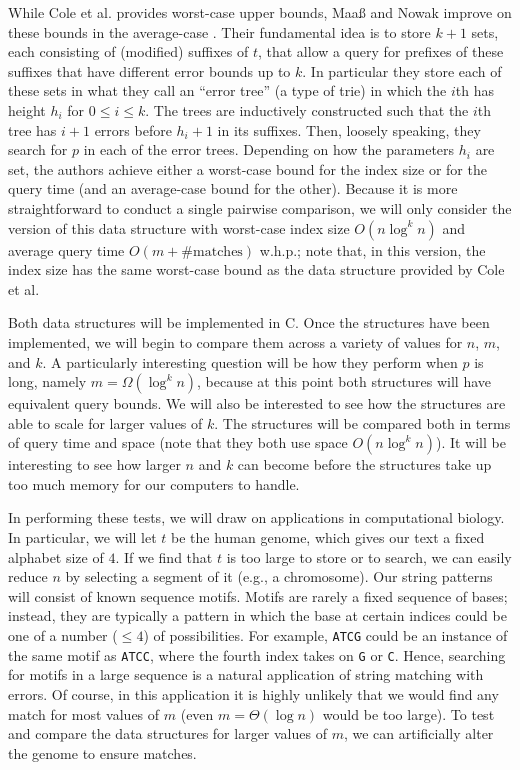 \documentclass[11pt]{article}
\begin{document}
While Cole et al. provides worst-case upper bounds, Maa{\ss} and Nowak improve on these bounds in the average-case \cite{maas}.
Their fundamental idea is to store $k+1$ sets, each consisting of (modified) suffixes of $t$, that allow a query for prefixes of these suffixes that have different error bounds up to $k$.
In particular they store each of these sets in what they call an ``error tree'' (a type of trie) in which the $i$th has height $h_i$ for $0 \leq i \leq k$.
The trees are inductively constructed such that the $i$th tree has $i+1$ errors before $h_i + 1$ in its suffixes.
Then, loosely speaking, they search for $p$ in each of the error trees.
Depending on how the parameters $h_i$ are set, the authors achieve either a worst-case bound for the index size or for the query time (and an average-case bound for the other).
Because it is more straightforward to conduct a single pairwise comparison, we will only consider the version of this data structure with worst-case index size $O(n \log^k n)$ and average query time $O(m + \text{\# matches})$ w.h.p.; note that, in this version, the index size has the same worst-case bound as the data structure provided by Cole et al.

Both data structures will be implemented in C.
Once the structures have been implemented, we will begin to compare them across a variety of values for $n$, $m$, and $k$.
A particularly interesting question will be how they perform when $p$ is long, namely $m = \Omega(\log^k{n})$, because at this point both structures will have equivalent query bounds.
We will also be interested to see how the structures are able to scale for larger values of $k$.
The structures will be compared both in terms of query time and space (note that they both use space $O(n\log^k{n})$).
It will be interesting to see how larger $n$ and $k$ can become before the structures take up too much memory for our computers to handle. 


In performing these tests, we will draw on applications in computational biology.
In particular, we will let $t$ be the human genome, which gives our text a fixed alphabet size of $4$.
If we find that $t$ is too large to store or to search, we can easily reduce $n$ by selecting a segment of it (e.g., a chromosome).
Our string patterns will consist of known sequence motifs.
Motifs are rarely a fixed sequence of bases; instead, they are typically a pattern in which the base at certain indices could be one of a number ($\leq 4$) of possibilities.
For example, \texttt{ATCG} could be an instance of the same motif as \texttt{ATCC}, where the fourth index takes on \texttt{G} or \texttt{C}.
Hence, searching for motifs in a large sequence is a natural application of string matching with errors.
Of course, in this application it is highly unlikely that we would find any match for most values of $m$ (even $m = \Theta(\log n)$ would be too large).
To test and compare the data structures for larger values of $m$, we can artificially alter the genome to ensure matches.
\end{document}
